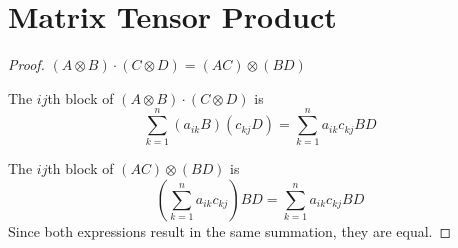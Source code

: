 \section{Matrix Tensor Product}

\begin{proof}$(A \otimes B) \cdot (C \otimes D) = (AC)\otimes (BD)$\gap

    The $ij$th block of $(A \otimes B) \cdot (C \otimes D)$ is
    \[
        \sum_{k=1}^n (a_{ik}B) (c_{kj} D) = \sum_{k=1}^n a_{ik} c_{kj} BD
    \]

    The $ij$th block of $(AC)\otimes (BD)$ is
    \[
        (\sum_{k=1}^n a_{ik} c_{kj}) BD = \sum_{k=1}^n a_{ik} c_{kj} BD
    \]
    Since both expressions result in the same summation, they are equal.
\end{proof}